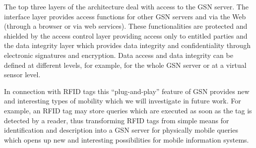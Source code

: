 The top three layers of the architecture deal with access to the GSN
server. The interface layer provides access functions for other GSN
servers and via the Web (through a browser or via web services).
These functionalities are protected and shielded by the access control
layer providing access only to entitled parties and the data integrity
layer which provides data integrity and confidentiality through
electronic signatures and encryption. Data access and data integrity
can be defined at different levels, for example, for the whole GSN
server or at a virtual sensor level.

In connection with RFID tags this ``plug-and-play'' feature of GSN
provides new and interesting types of mobility which we will
investigate in future work. For example, an RFID tag may store queries
which are executed as soon as the tag is detected by a reader, thus
transforming RFID tags from simple means for identification and
description into a GSN server for physically mobile queries which opens
up new and interesting possibilities for mobile information systems.


